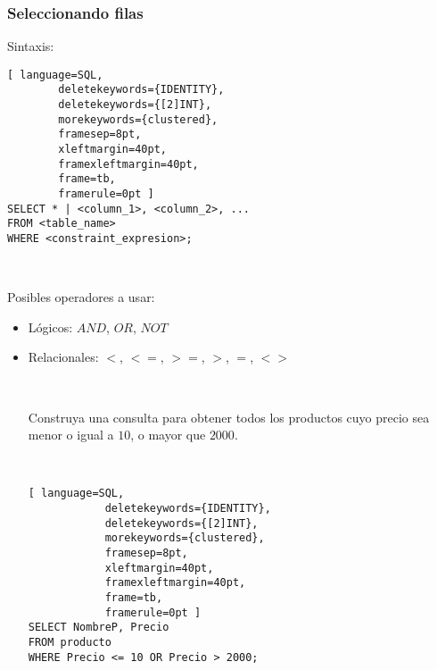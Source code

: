 \begin{frame}[fragile]
	
	\frametitle{Seleccionando filas}
	
	Sintaxis:
	\begin{lstlisting}[ language=SQL,
		deletekeywords={IDENTITY},
		deletekeywords={[2]INT},
		morekeywords={clustered},
		framesep=8pt,
		xleftmargin=40pt,
		framexleftmargin=40pt,
		frame=tb,
		framerule=0pt ]
SELECT * | <column_1>, <column_2>, ...
FROM <table_name>
WHERE <constraint_expresion>;
\end{lstlisting}

	\ 
	
	\pause 
	
	Posibles operadores a usar: 
	\begin{itemize}
	
		\item Lógicos: $AND$, $OR$, $NOT$
		
		\item Relacionales: $<$, $<=$, $>=$, $>$, $=$, $<>$
		
		
		\pause
		
		\ 
		
		Construya una consulta para obtener todos los productos cuyo precio sea menor o igual a $10$, o mayor que $2000$.
		
		\pause
		
		\ 
			\begin{lstlisting}[ language=SQL,
			deletekeywords={IDENTITY},
			deletekeywords={[2]INT},
			morekeywords={clustered},
			framesep=8pt,
			xleftmargin=40pt,
			framexleftmargin=40pt,
			frame=tb,
			framerule=0pt ]
SELECT NombreP, Precio
FROM producto
WHERE Precio <= 10 OR Precio > 2000; 
\end{lstlisting}
		
	\end{itemize}
	
\end{frame}


